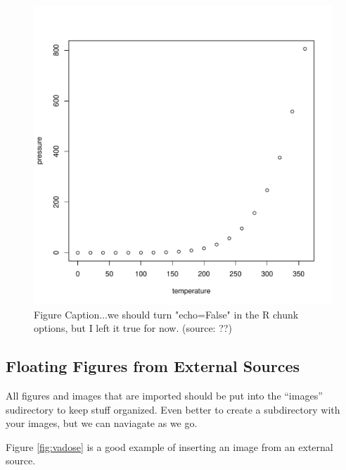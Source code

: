 \documentclass{book}\usepackage{knitr}
\begin{document}
\begin{figure}
\begin{knitrout}
\color{fgcolor}\begin{kframe}
\begin{alltt}
\end{alltt}
\end{kframe}
\includegraphics[width=\maxwidth]{figure/fig:pressure-1} 

\end{knitrout}
\caption{Figure Caption...we should turn "echo=False" in the R chunk options, but I left it true for now. (source: ??)} %
\label{fig:pressure}

\end{figure}

\subsection{Floating Figures from External Sources}

All figures and images that are imported should be put into the ``images'' sudirectory to keep stuff organized. Even better to create a subdirectory with your images, but we can naviagate as we go.

Figure \ref{fig:vadose} is a good example of inserting an image from an external source.
\end{document}
